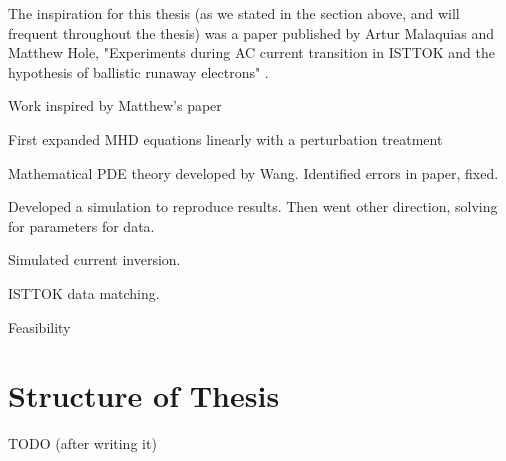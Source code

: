 The inspiration for this thesis (as we stated in the section above, and will frequent throughout the thesis) was a paper 
published by Artur Malaquias and Matthew Hole, "Experiments during AC current transition in ISTTOK and the hypothesis of ballistic 
runaway electrons" \cite{malaquias-matthew}.

Work inspired by Matthew's paper 

First expanded MHD equations linearly with a perturbation treatment

Mathematical PDE theory developed by Wang. Identified errors in paper, fixed. 

Developed a simulation to reproduce results. Then went other direction, 
solving for parameters for data. 

Simulated current inversion.

ISTTOK data matching.

Feasibility



\section{Structure of Thesis}

TODO (after writing it)

